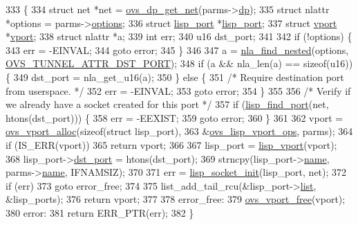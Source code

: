 \begin{DoxyCode}
333 \{
334     \textcolor{keyword}{struct }net *net = \hyperlink{datapath_8h_aef2302004ca1f45133eaef00bb3740eb}{ovs\_dp\_get\_net}(parms->\hyperlink{structvport__parms_a15faa866e3d35a721de77b347017499e}{dp});
335     \textcolor{keyword}{struct }nlattr *options = parms->\hyperlink{structvport__parms_a5c6027e758731e1a16968e77d4e2ca7c}{options};
336     \textcolor{keyword}{struct }\hyperlink{structlisp__port}{lisp\_port} *\hyperlink{structlisp__port}{lisp\_port};
337     \textcolor{keyword}{struct }\hyperlink{structvport}{vport} *\hyperlink{structvport}{vport};
338     \textcolor{keyword}{struct }nlattr *a;
339     \textcolor{keywordtype}{int} err;
340     u16 dst\_port;
341 
342     \textcolor{keywordflow}{if} (!options) \{
343         err = -EINVAL;
344         \textcolor{keywordflow}{goto} error;
345     \}
346 
347     a = \hyperlink{net_2netlink_8h_a5b73cd8f4a1d3d335642ee1492b7b2c2}{nla\_find\_nested}(options, \hyperlink{openvswitch_8h_a96a58e29e8dbf2b5bdeb775cba46556eae2bec9320cf2cc32228c9783e1bba39a}{OVS\_TUNNEL\_ATTR\_DST\_PORT});
348     \textcolor{keywordflow}{if} (a && nla\_len(a) == \textcolor{keyword}{sizeof}(u16)) \{
349         dst\_port = nla\_get\_u16(a);
350     \} \textcolor{keywordflow}{else} \{
351         \textcolor{comment}{/* Require destination port from userspace. */}
352         err = -EINVAL;
353         \textcolor{keywordflow}{goto} error;
354     \}
355 
356     \textcolor{comment}{/* Verify if we already have a socket created for this port */}
357     \textcolor{keywordflow}{if} (\hyperlink{vport-lisp_8c_ac170aebcefa72b3bccd6431da43de59d}{lisp\_find\_port}(net, htons(dst\_port))) \{
358         err = -EEXIST;
359         \textcolor{keywordflow}{goto} error;
360     \}
361 
362     vport = \hyperlink{linux_2vport_8c_a9198ee06111592d2cf6c3b2bf94561c1}{ovs\_vport\_alloc}(\textcolor{keyword}{sizeof}(\textcolor{keyword}{struct} lisp\_port),
363                 &\hyperlink{vport-lisp_8c_a758306cfbd9fe092cc094dbf165e5cf7}{ovs\_lisp\_vport\_ops}, parms);
364     \textcolor{keywordflow}{if} (IS\_ERR(vport))
365         \textcolor{keywordflow}{return} vport;
366 
367     lisp\_port = \hyperlink{vport-lisp_8c_af8f69fb0b9db12e9a324a9932011b302}{lisp\_vport}(vport);
368     lisp\_port->\hyperlink{structlisp__port_a3f0943c0da5e5c60f9e8e4068d49215e}{dst\_port} = htons(dst\_port);
369     strncpy(lisp\_port->\hyperlink{structlisp__port_ae0a7f15d977897e051bb338429f1d7fe}{name}, parms->\hyperlink{structvport__parms_a4f27e2a7b7dc0493c095cdaabe225b38}{name}, IFNAMSIZ);
370 
371     err = \hyperlink{vport-lisp_8c_a91b2b04c344bf1a50d02d4084fabf482}{lisp\_socket\_init}(lisp\_port, net);
372     \textcolor{keywordflow}{if} (err)
373         \textcolor{keywordflow}{goto} error\_free;
374 
375     list\_add\_tail\_rcu(&lisp\_port->\hyperlink{structlisp__port_adaf751d0e165cfbf047be71e680c3f19}{list}, &lisp\_ports);
376     \textcolor{keywordflow}{return} vport;
377 
378 error\_free:
379     \hyperlink{linux_2vport_8c_a17e57e95b47bad0bcf00e2e2805e2170}{ovs\_vport\_free}(vport);
380 error:
381     \textcolor{keywordflow}{return} ERR\_PTR(err);
382 \}
\end{DoxyCode}
